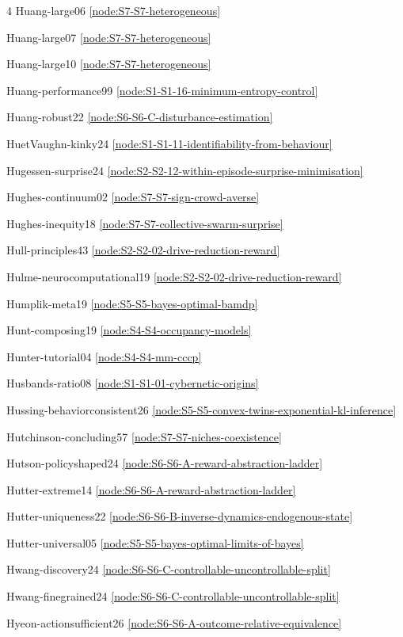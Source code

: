 \documentclass[10pt]{article}
\begin{document}
{\begin{multicols}{4}
Huang-large06 \hfill \ref{node:S7-S7-heterogeneous}\par
Huang-large07 \hfill \ref{node:S7-S7-heterogeneous}\par
Huang-large10 \hfill \ref{node:S7-S7-heterogeneous}\par
Huang-performance99 \hfill \ref{node:S1-S1-16-minimum-entropy-control}\par
Huang-robust22 \hfill \ref{node:S6-S6-C-disturbance-estimation}\par
HuetVaughn-kinky24 \hfill \ref{node:S1-S1-11-identifiability-from-behaviour}\par
Hugessen-surprise24 \hfill \ref{node:S2-S2-12-within-episode-surprise-minimisation}\par
Hughes-continuum02 \hfill \ref{node:S7-S7-sign-crowd-averse}\par
Hughes-inequity18 \hfill \ref{node:S7-S7-collective-swarm-surprise}\par
Hull-principles43 \hfill \ref{node:S2-S2-02-drive-reduction-reward}\par
Hulme-neurocomputational19 \hfill \ref{node:S2-S2-02-drive-reduction-reward}\par
Humplik-meta19 \hfill \ref{node:S5-S5-bayes-optimal-bamdp}\par
Hunt-composing19 \hfill \ref{node:S4-S4-occupancy-models}\par
Hunter-tutorial04 \hfill \ref{node:S4-S4-mm-cccp}\par
Husbands-ratio08 \hfill \ref{node:S1-S1-01-cybernetic-origins}\par
Hussing-behaviorconsistent26 \hfill \ref{node:S5-S5-convex-twins-exponential-kl-inference}\par
Hutchinson-concluding57 \hfill \ref{node:S7-S7-niches-coexistence}\par
Hutson-policyshaped24 \hfill \ref{node:S6-S6-A-reward-abstraction-ladder}\par
Hutter-extreme14 \hfill \ref{node:S6-S6-A-reward-abstraction-ladder}\par
Hutter-uniqueness22 \hfill \ref{node:S6-S6-B-inverse-dynamics-endogenous-state}\par
Hutter-universal05 \hfill \ref{node:S5-S5-bayes-optimal-limits-of-bayes}\par
Hwang-discovery24 \hfill \ref{node:S6-S6-C-controllable-uncontrollable-split}\par
Hwang-finegrained24 \hfill \ref{node:S6-S6-C-controllable-uncontrollable-split}\par
Hyeon-actionsufficient26 \hfill \ref{node:S6-S6-A-outcome-relative-equivalence}\par


\end{multicols}}
\end{document}
